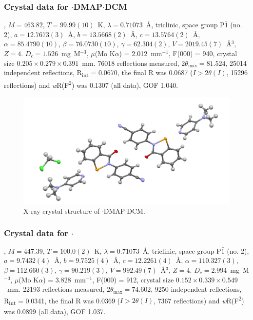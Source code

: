\begin{refsection}
\subsubsection{Crystal data for \texorpdfstring{$\cdot$DMAP$\cdot$DCM}{C21.50 H19 Cl N4 O Se}}
, $M=463.82$, $T=99.99(10)$~K, $\lambda=0.71073$~\AA, triclinic, space group P$\bar{1}$ (no. 2), $a = 12.7673(3)$~\AA, $b = 13.5668(2)$~\AA, $c = 13.5764(2)$~\AA, $\alpha = 85.4790(10)$\degree, $\beta = 76.0730(10)$\degree, $\gamma = 62.304(2)$\degree, $V = 2019.45(7)$~\AA$^{3}$, $Z = 4$. $D_{c}= 1.526$~mg~M$^{-3}$, $\mu$(Mo K$\alpha$) = 2.012~mm$^{-1}$, F(000) = 940, crystal size $0.205 \times 0.279 \times 0.391$~mm. 76018 reflections measured, $2\theta_{\mathrm{max}}=81.524$\degree, 25014 independent reflections, R\textsubscript{int} = 0.0670, the final R was 0.0687 ($I > 2\theta(I)$, 15296 reflections) and \emph{w}R(F\textsuperscript{2}) was 0.1307 (all data), GOF 1.040.

\begin{figure}
  \includegraphics[width=0.6\linewidth]{Figures/ebs-4cn-dmap-dcm-xtal.pdf}
  \caption{X-ray crystal structure of \texorpdfstring{$\cdot$DMAP$\cdot$DCM}{C21.50 H19 Cl N4 O Se}.}
\end{figure}

\subsubsection{Crystal data for \texorpdfstring{$\cdot$}{C23 H20 N4 O Se}}
, $M=447.39$, $T=100.0(2)$~K, $\lambda=0.71073$~\AA, triclinic, space group P$\bar{1}$ (no. 2), $a = 9.7432(4)$~\AA, $b = 9.7525(4)$~\AA, $c = 12.2261(4)$~\AA, $\alpha = 110.327(3)$\degree, $\beta = 112.660(3)$\degree, $\gamma = 90.219(3)$\degree, $V = 992.49(7)$~\AA$^{3}$, $Z = 4$. $D_{c}= 2.994$~mg~M$^{-3}$, $\mu$(Mo K$\alpha$) = 3.828~mm$^{-1}$, F(000) = 912, crystal size $0.152 \times 0.339 \times 0.549$~mm. 22193 reflections measured, $2\theta_{\mathrm{max}}=74.602$\degree, 9250 independent reflections, R\textsubscript{int} = 0.0341, the final R was 0.0369 ($I > 2\theta(I)$, 7367 reflections) and \emph{w}R(F\textsuperscript{2}) was 0.0899 (all data), GOF 1.037.


\end{refsection}
